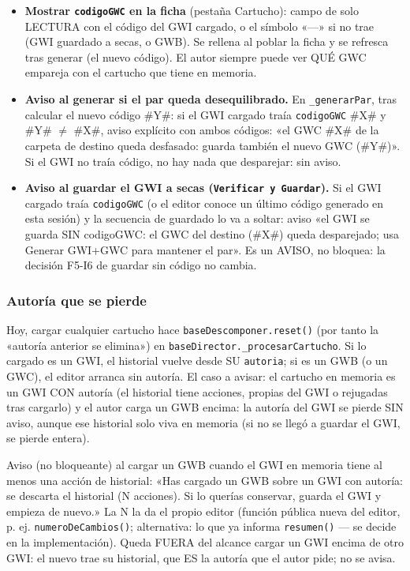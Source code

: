 \begin{itemize}
	\item \textbf{Mostrar \texttt{codigoGWC} en la ficha} (pestaña Cartucho): campo de solo LECTURA con el código del GWI cargado, o el símbolo «---» si no trae (GWI guardado a secas, o GWB). Se rellena al poblar la ficha y se refresca tras generar (el nuevo código). El autor siempre puede ver QUÉ GWC empareja con el cartucho que tiene en memoria.
	\item \textbf{Aviso al generar si el par queda desequilibrado.} En \texttt{\_generarPar}, tras calcular el nuevo código \#Y\#: si el GWI cargado traía \texttt{codigoGWC} \#X\# y \#Y\# $\neq$ \#X\#, aviso explícito con ambos códigos: «el GWC \#X\# de la carpeta de destino queda desfasado: guarda también el nuevo GWC (\#Y\#)». Si el GWI no traía código, no hay nada que desparejar: sin aviso.
	\item \textbf{Aviso al guardar el GWI a secas (\texttt{Verificar y Guardar}).} Si el GWI cargado traía \texttt{codigoGWC} (o el editor conoce un último código generado en esta sesión) y la secuencia de guardado lo va a soltar: aviso «el GWI se guarda SIN codigoGWC: el GWC del destino (\#X\#) queda desparejado; usa Generar GWI+GWC para mantener el par». Es un AVISO, no bloquea: la decisión F5-I6 de guardar sin código no cambia.
\end{itemize}

\subsubsection{Autoría que se pierde}
\label{sec:F5I17Autoria}

Hoy, cargar cualquier cartucho hace \texttt{baseDescomponer.reset()} (por tanto la «autoría anterior se elimina») en \texttt{baseDirector.\_procesarCartucho}. Si lo cargado es un GWI, el historial vuelve desde SU \texttt{autoria}; si es un GWB (o un GWC), el editor arranca sin autoría. El caso a avisar: el cartucho en memoria es un GWI CON autoría (el historial tiene acciones, propias del GWI o rejugadas tras cargarlo) y el autor carga un GWB encima: la autoría del GWI se pierde SIN aviso, aunque ese historial solo viva en memoria (si no se llegó a guardar el GWI, se pierde entera).

Aviso (no bloqueante) al cargar un GWB cuando el GWI en memoria tiene al menos una acción de historial: «Has cargado un GWB sobre un GWI con autoría: se descarta el historial (N acciones). Si lo querías conservar, guarda el GWI y empieza de nuevo.» La N la da el propio editor (función pública nueva del editor, p. ej. \texttt{numeroDeCambios()}; alternativa: lo que ya informa \texttt{resumen()} — se decide en la implementación). Queda FUERA del alcance cargar un GWI encima de otro GWI: el nuevo trae su historial, que ES la autoría que el autor pide; no se avisa.

